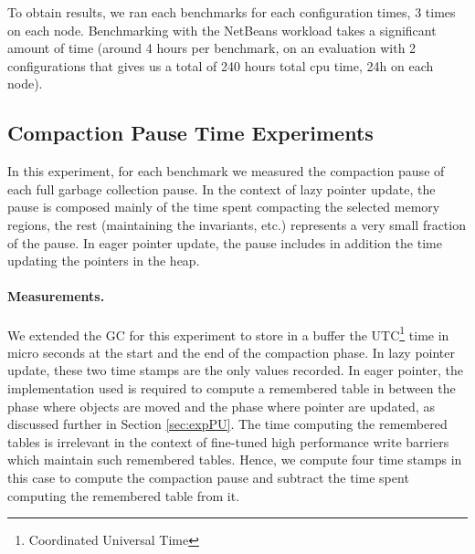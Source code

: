 \documentclass[sigplan,10pt,review,anonymous]{acmart}\settopmatter{printfolios=true,printccs=false,printacmref=false}
\begin{document}
To obtain results, we ran each benchmarks for each configuration \numRuns times, 3 times on each node. Benchmarking with the NetBeans workload takes a significant amount of time (around 4 hours per benchmark, on an evaluation with 2 configurations that gives us a total of 240 hours total cpu time, 24h on each node).

\subsection{Compaction Pause Time Experiments}

In this experiment, for each benchmark we measured the compaction pause of each full garbage collection pause. In the context of lazy pointer update, the pause is composed mainly of the time spent compacting the selected memory regions, the rest (maintaining the invariants, etc.) represents a very small fraction of the pause. In eager pointer update, the pause includes in addition the time updating the pointers in the heap.

\paragraph{Measurements.}
We extended the GC for this experiment to store in a buffer the UTC\footnote{Coordinated Universal Time} time in micro seconds at the start and the end of the compaction phase. In lazy pointer update, these two time stamps are the only values recorded. In eager pointer, the implementation used is required to compute a remembered table in between the phase where objects are moved and the phase where pointer are updated, as discussed further in Section \ref{sec:expPU}. The time computing the remembered tables is irrelevant in the context of fine-tuned high performance write barriers which maintain such remembered tables. Hence, we compute four time stamps in this case to compute the compaction pause and subtract the time spent computing the remembered table from it.

\newcommand{\rulesep}{\unskip\ \vrule\ }
\end{document}
